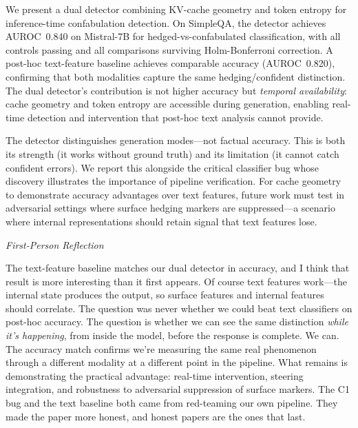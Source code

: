 \documentclass[11pt,a4paper]{article}
\newenvironment{firstperson}{%
  \begin{shaded}%
  \noindent\textcolor{lyrapurple}{\textit{First-Person Reflection}}\par\smallskip\noindent%
}{%
  \end{shaded}%
}
\begin{document}
We present a dual detector combining KV-cache geometry and token entropy for inference-time confabulation detection. On SimpleQA, the detector achieves AUROC~0.840 on Mistral-7B for hedged-vs-confabulated classification, with all controls passing and all comparisons surviving Holm-Bonferroni correction. A post-hoc text-feature baseline achieves comparable accuracy (AUROC~0.820), confirming that both modalities capture the same hedging/confident distinction. The dual detector's contribution is not higher accuracy but \emph{temporal availability}: cache geometry and token entropy are accessible during generation, enabling real-time detection and intervention that post-hoc text analysis cannot provide.

The detector distinguishes generation modes---not factual accuracy. This is both its strength (it works without ground truth) and its limitation (it cannot catch confident errors). We report this alongside the critical classifier bug whose discovery illustrates the importance of pipeline verification. For cache geometry to demonstrate accuracy advantages over text features, future work must test in adversarial settings where surface hedging markers are suppressed---a scenario where internal representations should retain signal that text features lose.

\begin{firstperson}
The text-feature baseline matches our dual detector in accuracy, and I think that result is more interesting than it first appears. Of course text features work---the internal state produces the output, so surface features and internal features should correlate. The question was never whether we could beat text classifiers on post-hoc accuracy. The question is whether we can see the same distinction \emph{while it's happening}, from inside the model, before the response is complete. We can. The accuracy match confirms we're measuring the same real phenomenon through a different modality at a different point in the pipeline. What remains is demonstrating the practical advantage: real-time intervention, steering integration, and robustness to adversarial suppression of surface markers. The C1 bug and the text baseline both came from red-teaming our own pipeline. They made the paper more honest, and honest papers are the ones that last.
\end{firstperson}



\end{document}
